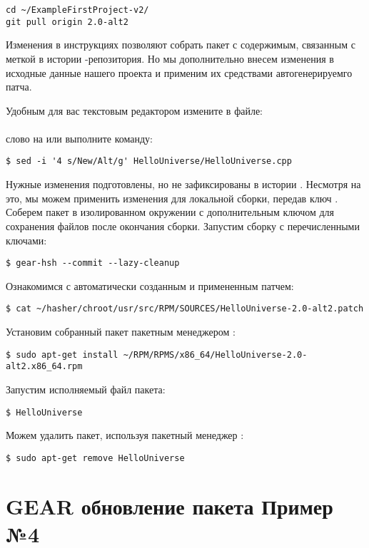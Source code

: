 \begin{verbatim}
cd ~/ExampleFirstProject-v2/
git pull origin 2.0-alt2
\end{verbatim}

Изменения в инструкциях позволяют собрать пакет с содержимым, связанным с меткой
 в истории -репозитория. Но мы дополнительно внесем изменения
в исходные данные нашего проекта и применим их средствами автогенерируемго патча.

Удобным для вас текстовым редактором измените в файле:\\
\\
слово  на  или выполните команду:
\begin{verbatim}
$ sed -i '4 s/New/Alt/g' HelloUniverse/HelloUniverse.cpp
\end{verbatim}

Нужные изменения подготовлены, но не зафиксированы в истории . Несмотря на это,
мы можем применить изменения для локальной сборки, передав  ключ .
Соберем пакет в изолированном окружении с  дополнительным ключом  для
сохранения файлов после окончания сборки.
Запустим сборку с перечисленными ключами:
\begin{verbatim}
$ gear-hsh --commit --lazy-cleanup
\end{verbatim}

Ознакомимся с автоматически созданным и примененным патчем:
\begin{verbatim}
$ cat ~/hasher/chroot/usr/src/RPM/SOURCES/HelloUniverse-2.0-alt2.patch
\end{verbatim}

Установим  собранный пакет пакетным менеджером :
\begin{verbatim}
$ sudo apt-get install ~/RPM/RPMS/x86_64/HelloUniverse-2.0-alt2.x86_64.rpm
\end{verbatim}

Запустим исполняемый файл пакета:
\begin{verbatim}
$ HelloUniverse
\end{verbatim}

Можем удалить пакет, используя пакетный менеджер :
\begin{verbatim}
$ sudo apt-get remove HelloUniverse
\end{verbatim}

\section{GEAR обновление пакета \textbf{Пример №4}}

